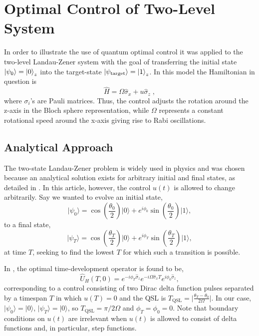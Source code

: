 \chapter{Optimal Control of Two-Level System}
In order to illustrate the use of quantum optimal control it was applied to the two-level Landau-Zener system with the goal of transferring the initial state $\ket{\psi _0} = \ket{0}_z$ into the target-state $\ket{\psi _{\mathrm{target}}} = \ket{1}_z$. In this model the Hamiltonian in question is
\begin{equation}\label{eq:LZ_ham}
	\hat{H} = \Omega \hat{\sigma}_x + u \hat{\sigma}_z \; ,
\end{equation}
where $\sigma_i$'s are Pauli matrices. Thus, the control adjusts the rotation around the z-axis in the Bloch sphere representation, while $\Omega$ represents a constant rotational speed around the x-axis giving rise to Rabi oscillations.

\section{Analytical Approach}
The two-state Landau-Zener problem is widely used in physics and was chosen because an analytical solution exists for arbitrary initial and final states, as detailed in \cite{QOCTtwolevel}. In this article, however, the control $u(t)$ is allowed to change arbitrarily. Say we wanted to evolve an initial state,
\begin{equation}
\lvert \psi_0 \rangle = \cos{\left(\frac{\theta_0}{2}\right)} \lvert 0 \rangle + e^{i\phi_0}\sin{\left(\frac{\theta_0}{2}\right)}\lvert 1 \rangle,
\end{equation}
to a final state,
\begin{equation}
\lvert \psi_T \rangle = \cos{\left(\frac{\theta_T}{2}\right)} \lvert 0 \rangle + e^{i\phi_T}\sin{\left(\frac{\theta_T}{2}\right)}\lvert 1 \rangle,
\end{equation}
at time $T$, seeking to find the lowest $T$ for which such a transition is possible.

In \cite{QOCTtwolevel}, the optimal time-development operator is found to be,
\begin{equation}
\hat{U}_H(T,0)=e^{-i\phi_T\hat{\sigma}_z}e^{-i\Omega\hat{\sigma}_xT}e^{i\phi_0\hat{\sigma}_z},
\end{equation}
corresponding to a control consisting of two Dirac delta function pulses separated by a timespan $T$ in which $u(T)=0$ and the QSL is $T_{\mathrm{QSL}}=\lvert\frac{\theta_T-\theta_0}{2\Omega}\rvert$. In our case, $\lvert\psi_0\rangle=\lvert 0\rangle$, $\lvert\psi_T\rangle=\lvert 0\rangle$, so $T_{\mathrm{QSL}}=\pi/2\Omega$ and $\phi_T=\phi_0=0$. Note that boundary conditions on $u(t)$ are irrelevant when $u(t)$ is allowed to consist of delta functions and, in particular, step functions.

